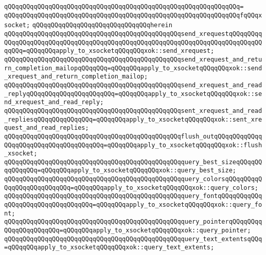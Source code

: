\verb|qQQqqQQqqQQqqQQqqQQqqQQqqQQqqQQqqQQqqQQqqQQqqQQqqQQqqQQqqQQqqQQq=|\newline
\verb|qQQqqQQqqQQqqQQqqQQqqQQqqQQqqQQqqQQqqQQqqQQqqQQqqQQqqQQqqQQqqQQqfqQQqxsocket;|\newline
\newline
\verb|qQQqqQQqqQQqqQQqqQQqqQQqqQQqqQQqherein|\newline
\newline
\verb|qQQqqQQqqQQqqQQqqQQqqQQqqQQqqQQqqQQqqQQqqQQqqQQqsend_xrequestqQQqqQQqqQQqqQQqqQQqqQQqqQQqqQQqqQQqqQQqqQQqqQQqqQQqqQQqqQQqqQQqqQQqqQQqqQQqqQQqqQQq=qQQqqQQqapply_to_xsocketqQQqqQQqxok::send_xrequest;|\newline
\verb|qQQqqQQqqQQqqQQqqQQqqQQqqQQqqQQqqQQqqQQqqQQqqQQqsend_xrequest_and_return_completion_mailopqQQqqQQq=qQQqqQQqapply_to_xsocketqQQqqQQqxok::send_xrequest_and_return_completion_mailop;|\newline
\newline
\verb|qQQqqQQqqQQqqQQqqQQqqQQqqQQqqQQqqQQqqQQqqQQqqQQqsend_xrequest_and_read_replyqQQqqQQqqQQqqQQqqQQqqQQq=qQQqqQQqapply_to_xsocketqQQqqQQqxok::send_xrequest_and_read_reply;|\newline
\verb|qQQqqQQqqQQqqQQqqQQqqQQqqQQqqQQqqQQqqQQqqQQqqQQqsent_xrequest_and_read_repliesqQQqqQQqqQQqqQQq=qQQqqQQqapply_to_xsocketqQQqqQQqxok::sent_xrequest_and_read_replies;|\newline
\newline
\verb|qQQqqQQqqQQqqQQqqQQqqQQqqQQqqQQqqQQqqQQqqQQqqQQqflush_outqQQqqQQqqQQqqQQqqQQqqQQqqQQqqQQqqQQqqQQq=qQQqqQQqapply_to_xsocketqQQqqQQqxok::flush_xsocket;|\newline
\newline
\verb|qQQqqQQqqQQqqQQqqQQqqQQqqQQqqQQqqQQqqQQqqQQqqQQqquery_best_sizeqQQqqQQqqQQqqQQq=qQQqqQQqapply_to_xsocketqQQqqQQqxok::query_best_size;|\newline
\verb|qQQqqQQqqQQqqQQqqQQqqQQqqQQqqQQqqQQqqQQqqQQqqQQqquery_colorsqQQqqQQqqQQqqQQqqQQqqQQqqQQq=qQQqqQQqapply_to_xsocketqQQqqQQqxok::query_colors;|\newline
\verb|qQQqqQQqqQQqqQQqqQQqqQQqqQQqqQQqqQQqqQQqqQQqqQQqquery_fontqQQqqQQqqQQqqQQqqQQqqQQqqQQqqQQqqQQq=qQQqqQQqapply_to_xsocketqQQqqQQqxok::query_font;|\newline
\verb|qQQqqQQqqQQqqQQqqQQqqQQqqQQqqQQqqQQqqQQqqQQqqQQqquery_pointerqQQqqQQqqQQqqQQqqQQqqQQq=qQQqqQQqapply_to_xsocketqQQqqQQqxok::query_pointer;|\newline
\verb|qQQqqQQqqQQqqQQqqQQqqQQqqQQqqQQqqQQqqQQqqQQqqQQqquery_text_extentsqQQq=qQQqqQQqapply_to_xsocketqQQqqQQqxok::query_text_extents;|\newline
